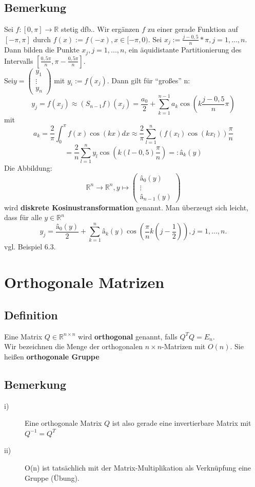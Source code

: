 \documentclass{scrbook}
\begin{document}
\section{Bemerkung}
Sei $f:[0,\pi] \to \mathbb{R}$ stetig dfb.. Wir ergänzen $f$ zu einer gerade Funktion auf $[-\pi,\pi]$ durch $f(x) := f(-x), x\in [ -\pi,0)$. Sei $x_j := \frac{j-0,5}{n} * \pi, j=1,...,n$. Dann bilden die Punkte $x_j,j=1,...,n$, ein äquidistante Partitionierung des Intervalls $\left[ \frac{0,5 \pi}{n}, \pi-\frac{0,5\pi}{n}\right]$.\\Sei$y = \left(\begin{array}{c}
y_1\\\vdots\\y_n
\end{array}
\right)$ mit $y_i := f(x_j)$. Dann gilt für "`großes"' n:
\[y_j = f(x_j) \approx (S_{n-1}f)(x_j) = \frac{a_0}{2}+ \sum^{n-1}_{k=1} a_k \cos(k \frac{j-0,5}{n}\pi)\]
mit
\[
a_k = \frac{2}{\pi}\int^{\pi}_{0}f(x)\cos(kx)dx \approx \frac{2}{\pi}\sum^n_{l=1}( f(x_l) \cos(kx_l)) \frac{\pi}{n}
\]
\[
= \frac{2}{n} \sum^n_{l=1} y_l \cos(k(l-0,5)\frac{\pi}{n}) =: \text{â}_k(y)
\]
Die Abbildung:
\[\mathbb{R}^n \to \mathbb{R}^n, y \mapsto
\left(
\begin{array}{c}
\text{â}_0(y)\\ \vdots\\\text{â}_{n-1}(y)
\end{array}
\right)
\]
wird \textbf{diskrete Kosinustransformation} genannt. Man überzeugt sich leicht, dass für alle $y \in \mathbb{R}^n$
\[
y_j = \frac{\text{â}_0(y)}{2} + \sum^n_{k=1} \text{â}_k(y) \cos(\frac{\pi}{n} k(j-\frac{1}{2})),j=1,...,n.
\]
vgl. Beispiel 6.3.
\chapter{Orthogonale Matrizen}
\section{Definition}
Eine Matrix $Q \in \mathbb{R}^{n \times n}$ wird \textbf{orthogonal} genannt, falls $Q^TQ = E_n$.\\
Wir bezeichnen die Menge der orthogonalen $n\times n$-Matrizen mit $O(n)$. Sie heißen \textbf{orthogonale Gruppe}
\section{Bemerkung}
\begin{description}
\item[i)]Eine orthogonale Matrix $Q$ ist also gerade eine invertierbare Matrix mit $Q^{-1} = Q^T$
\item[ii)] O(n) ist tatsächlich mit der Matrix-Multiplikation als Verknüpfung eine Gruppe (Übung).
\end{description}
\end{document}
